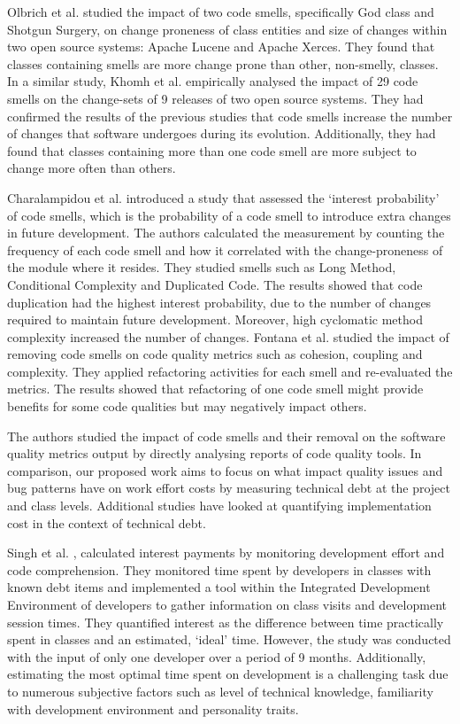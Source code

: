 \documentclass{mpaper}
\begin{document}
Olbrich et al. \cite{Olbrich2009} studied the impact of two code smells,
specifically God class and Shotgun Surgery, on change proneness of class
entities and size of changes within two open source systems: Apache Lucene and
Apache Xerces. They found that classes containing smells are more change prone
than other, non-smelly, classes. In a similar study, Khomh et al.
\cite{Khomh2009} empirically analysed the impact of 29 code smells on the
change-sets of 9 releases of two open source systems. They had confirmed the
results of the previous studies that code smells increase the number of changes
that software undergoes during its evolution. Additionally, they had found that
classes containing more than one code smell are more subject to change more
often than others. 

Charalampidou et al. \cite{Charalampidou2017} introduced a study that assessed
the `interest probability' of code smells, which is the probability of a code
smell to introduce extra changes in future development. The authors calculated
the measurement by counting the frequency of each code smell and how it
correlated with the change-proneness of the module where it resides. They
studied smells such as Long Method, Conditional Complexity and Duplicated Code.
The results showed that code duplication had the highest interest probability,
due to the number of changes required to maintain future development. Moreover,
high cyclomatic method complexity increased the number of changes. Fontana et
al. \cite{Fontana2012} studied the impact of removing code smells on code
quality metrics such as cohesion, coupling and complexity. They applied
refactoring activities for each smell and re-evaluated the metrics. The results
showed that refactoring of one code smell might provide benefits for some code
qualities but may negatively impact others.

The authors studied the impact of code smells and their removal on the software
quality metrics output by directly analysing reports of code quality tools. In
comparison, our proposed work aims to focus on what impact quality issues and
bug patterns have on work effort costs by measuring technical debt at the
project and class levels. Additional studies have looked at quantifying
implementation cost in the context of technical debt.

Singh et al. \cite{Singh2014}, calculated interest payments by monitoring
development effort and code comprehension. They monitored time spent by
developers in classes with known debt items and implemented a tool within the
Integrated Development Environment of developers to gather information on class
visits and development session times. They quantified interest as the difference
between time practically spent in classes and an estimated, `ideal' time.
However, the study was conducted with the input of only one developer over a
period of 9 months. Additionally, estimating the most optimal time spent on
development is a challenging task due to numerous subjective factors such as
level of technical knowledge, familiarity with development environment and
personality traits.
\end{document}
